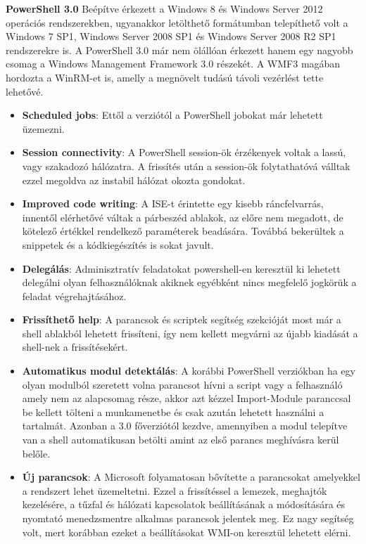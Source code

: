 \documentclass[12pt,oneside,justify,table]{book}
\begin{document}
\break
\noindent\textbf{PowerShell 3.0}
\newline Beépítve érkezett a Windows 8 és Windows Server 2012 operációs rendszerekben, ugyanakkor letölthető formátumban telepíthető volt a Windows 7 SP1, Windows Server 2008 SP1 és Windows Server 2008 R2 SP1 rendszerekre is. 
A PowerShell 3.0 már nem ölállóan érkezett hanem egy nagyobb csomag a Windows Management Framework 3.0 részekét. A WMF3 magában hordozta a WinRM-et is, amelly a megnövelt tudású távoli vezérlést tette lehetővé.
\begin{itemize}
	\item \textbf{Scheduled jobs}: Ettől a verziótól a PowerShell jobokat már lehetett üzemezni.
	\item \textbf{Session connectivity}: A PowerShell session-ök érzékenyek voltak a lassú, vagy szakadozó hálózatra. A frissítés után a session-ök folytathatóvá válltak ezzel megoldva az instabil hálózat okozta gondokat.
	\item \textbf{Improved code writing}: A ISE-t érintette egy kisebb ráncfelvarrás, innentől elérhetővé váltak a párbeszéd ablakok, az előre nem megadott, de kötelező értékkel rendelkező paraméterek beadására. Továbbá bekerültek a snippetek és a kódkiegészítés is sokat javult.
	\item \textbf{Delegálás}: Adminisztratív feladatokat powershell-en keresztül ki lehetett delegálni olyan felhasználóknak akiknek egyébként nincs megfelelő jogkörük a feladat végrehajtásához. 
	\item \textbf{Frissíthető help}: A parancsok és scriptek segítség szekcióját most már a shell ablakból lehetett frissíteni, így nem kellett megvárni az újabb kiadását a shell-nek a frissítésekért.
	\item \textbf{Automatikus modul detektálás}: A korábbi PowerShell verziókban ha egy olyan modulból szeretett volna parancsot hívni a script vagy a felhasználó amely nem az alapcsomag része, akkor azt kézzel Import-Module paranccsal be kellett tölteni a munkamenetbe és csak azután lehetett használni a tartalmát. Azonban a 3.0 főverziótól kezdve, amennyiben a modul telepítve van a shell automatikusan betölti amint az első parancs meghívásra kerül belőle.
	\item \textbf{Új parancsok}: A Microsoft folyamatosan bővítette a parancsokat amelyekkel a rendszert lehet üzemeltetni. Ezzel a frissítéssel a lemezek, meghajtók kezelésére, a tűzfal és hálózati kapcsolatok beállításának a módosítására és nyomtató menedzsmentre alkalmas parancsok jelentek meg. Ez nagy segítség volt, mert korábban ezeket a beállításokat WMI-on keresztül lehetett elérni. 
\end{itemize}
\end{document}
